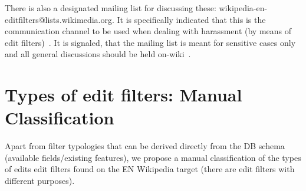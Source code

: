 There is also a designated mailing list for discussing these: wikipedia-en-editfilters@lists.wikimedia.org.
It is specifically indicated that this is the communication channel to be used when dealing with harassment (by means of edit filters)~\cite{Wikipedia:EditFilter}.
It is signaled, that the mailing list is meant for sensitive cases only and all general discussions should be held on-wiki~\cite{Wikipedia:EditFilter}.

\begin{comment}
https://en.wikipedia.org/wiki/Wikipedia_talk:Edit_filter/Archive_1
// so, according to Werdna, main targetted group are especially determined vandals in which case it makes sense to hide filters' heuristics from them. Which would also explain why 2/3 of the filters are hidden

\url{https://en.wikipedia.org/wiki/Wikipedia:Edit_filter}
"Non-admins in good standing who wish to review a proposed but hidden filter may message the mailing list for details."
// what is "good standing"?
// what are the arguments for hiding a filter? --> particularly obnoctious vandals can see how their edits are being filtered and circumvent them; security through obscurity -- compare also comments on the TalkPage; this is not crypto.
// are users still informed if their edit triggers a hidden filter? - most certainly; the warnings logic has nothing to do with whether the filter is hidden or not

"For all filters, including those hidden from public view, a brief description of what the rule targets is displayed in the log, the list of active filters, and in any error messages generated by the filter. " //yeah, well, that's the public comment, aka name of the filter

"Be careful not to test sensitive parts of private filters in a public test filter (such as Filter 1): use a private test filter (for example Filter 2) if testing is required."

\end{comment}

\section{Types of edit filters: Manual Classification}

Apart from filter typologies that can be derived directly from the DB schema (available fields/existing features), we propose a manual classification of the types of edits edit filters found on the EN Wikipedia target (there are edit filters with different purposes).


